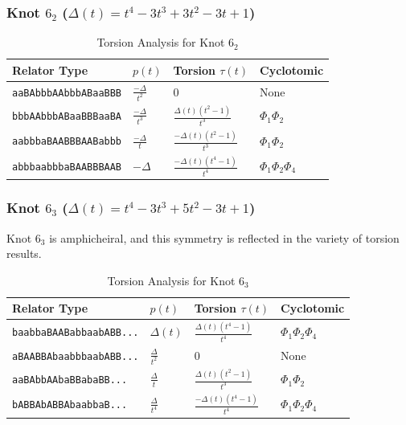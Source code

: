 \documentclass[a4paper,12pt]{article}
\begin{document}
\subsubsection{Knot $6_2$ ($\Delta(t) = t^4 - 3t^3 + 3t^2 - 3t + 1$)}
\begin{table}[htbp]
\centering
\caption{Torsion Analysis for Knot $6_2$}
\small
\begin{tabular}{p{5cm} p{2cm} p{4cm} p{3cm}}
\toprule
\textbf{Relator Type} & \textbf{$p(t)$} & \textbf{Torsion $\tau(t)$} & \textbf{Cyclotomic} \\
\midrule
\texttt{aaBAbbbAAbbbABaaBBB} & $\frac{-\Delta}{t^2}$ & $0$ & None \\
\texttt{bbbAAbbbABaaBBBaaBA} & $\frac{-\Delta}{t^3}$ & $\frac{\Delta(t)(t^2-1)}{t^3}$ & $\Phi_1 \Phi_2$ \\
\texttt{aabbbaBAABBBAABabbb} & $\frac{-\Delta}{t}$ & $\frac{-\Delta(t)(t^2-1)}{t^3}$ & $\Phi_1 \Phi_2$ \\
\texttt{abbbaabbbaBAABBBAAB} & $-\Delta$ & $\frac{-\Delta(t)(t^4-1)}{t^4}$ & $\Phi_1 \Phi_2 \Phi_4$ \\
\bottomrule
\end{tabular}
\end{table}

\subsubsection{Knot $6_3$ ($\Delta(t) = t^4 - 3t^3 + 5t^2 - 3t + 1$)}
Knot $6_3$ is amphicheiral, and this symmetry is reflected in the variety of torsion results.

\begin{table}[htbp]
\centering
\caption{Torsion Analysis for Knot $6_3$}
\small
\begin{tabular}{p{5cm} p{2cm} p{4cm} p{3cm}}
\toprule
\textbf{Relator Type} & \textbf{$p(t)$} & \textbf{Torsion $\tau(t)$} & \textbf{Cyclotomic} \\
\midrule
\texttt{baabbaBAABabbaabABB...} & $\Delta(t)$ & $\frac{\Delta(t)(t^4-1)}{t^4}$ & $\Phi_1 \Phi_2 \Phi_4$ \\
\texttt{aBAABBAbaabbbaabABB...} & $\frac{\Delta}{t^2}$ & $0$ & None \\
\texttt{aaBAbbAAbaBBabaBB...} & $\frac{\Delta}{t}$ & $\frac{\Delta(t)(t^2-1)}{t^3}$ & $\Phi_1 \Phi_2$ \\
\texttt{bABBAbABBAbaabbaB...} & $\frac{\Delta}{t^4}$ & $\frac{-\Delta(t)(t^4-1)}{t^4}$ & $\Phi_1 \Phi_2 \Phi_4$ \\
\bottomrule
\end{tabular}
\end{table}
\end{document}
